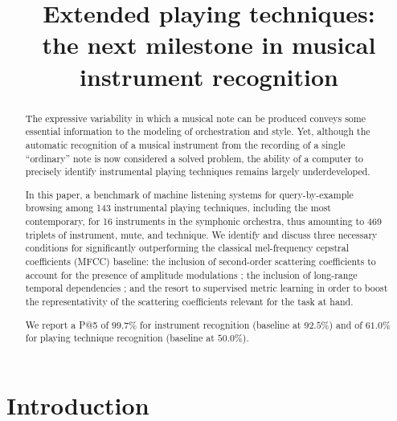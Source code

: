 \documentclass{article}
\title{Extended playing techniques: \\
the next milestone in musical instrument recognition}
\begin{document}
%
\maketitle


\begin{abstract}
  The expressive variability in which a musical note can be produced conveys some essential information to the modeling of orchestration and style. Yet, although the automatic recognition of a musical instrument from the recording of a single ``ordinary'' note is now considered a solved problem, the ability of a computer to precisely identify instrumental playing techniques remains largely underdeveloped.

  In this paper, a benchmark of machine listening systems for query-by-example browsing among 143 instrumental playing techniques, including the most contemporary, for 16 instruments in the symphonic orchestra, thus amounting to 469 triplets of instrument, mute, and technique. We identify and discuss three necessary conditions for significantly outperforming the classical mel-frequency cepstral coefficients (MFCC) baseline: the inclusion of second-order scattering coefficients to account for the presence of amplitude modulations ; the inclusion of long-range temporal dependencies ; and the resort to supervised metric learning in order to boost the representativity of the scattering coefficients relevant for the task at hand.

  We report a P@5 of $99.7\%$ for instrument recognition (baseline at $92.5\%$) and of $61.0\%$ for playing technique recognition (baseline at $50.0\%$).

\end{abstract}



\section{Introduction}\label{sec:introduction}
\end{document}
